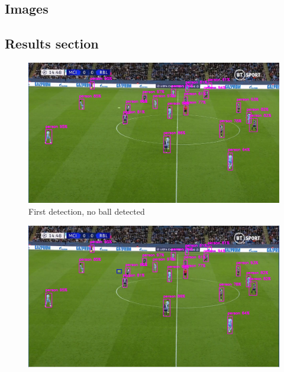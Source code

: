 \documentclass[
    11pt,
    twoside
]{report}
\begin{document}
\printbibliography





\appendix
\renewcommand{\thesection}{\Alph{section}.\arabic{section}}
\setcounter{section}{0}
\begin{appendices}


\section{Images}


\listoffigures


\subsection{Results section}

\begin{figure}[H]
    \includegraphics[keepaspectratio, width=\columnwidth]{first.png}
    \caption{First detection, no ball detected}
    \label{img:1}
\end{figure}
\begin{figure}[H]
    \includegraphics[keepaspectratio, width=\columnwidth]{Screenshot_2022-03-03_21-32-51.png}

\end{figure}
\end{appendices}
\end{document}
